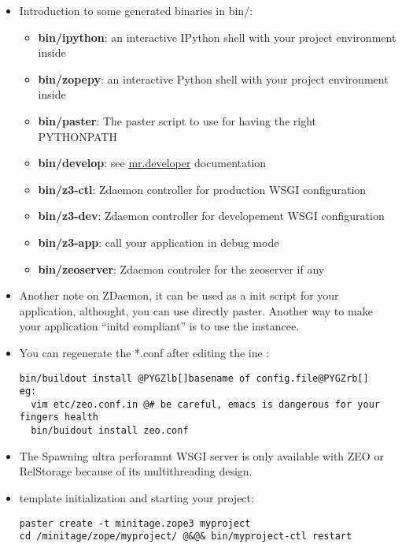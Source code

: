 \documentclass[letterpaper,10pt,english]{sphinxmanual}
\begin{document}
\begin{itemize}
\begin{itemize}
\end{itemize}

\item {} 
Introduction to some generated binaries in bin/:
\begin{itemize}
\item {} 
\textbf{bin/ipython}: an interactive IPython shell with your project environment inside

\item {} 
\textbf{bin/zopepy}: an interactive Python shell with your project environment inside

\item {} 
\textbf{bin/paster}: The paster script to use for having the right PYTHONPATH

\item {} 
\textbf{bin/develop}: see \href{http://pypi.python.org/pypi/mr.developer}{mr.developer} documentation

\item {} 
\textbf{bin/z3-ctl}: Zdaemon controller for production WSGI configuration

\item {} 
\textbf{bin/z3-dev}: Zdaemon controller for developement WSGI configuration

\item {} 
\textbf{bin/z3-app}: call your application in debug mode

\item {} 
\textbf{bin/zeoserver}: Zdaemon controler for the zeoserver if any

\end{itemize}

\item {} 
Another note on ZDaemon, it can be used as a init script for your application,
althought, you can use directly paster. Another way to make your application
``initd compliant'' is to use the  instancee.

\item {} 
You can regenerate the *.conf after editing the  ine :

\begin{Verbatim}[commandchars=@\[\]]
bin/buildout install @PYGZlb[]basename of config.file@PYGZrb[]
eg:
  vim etc/zeo.conf.in @# be careful, emacs is dangerous for your fingers health
  bin/buidout install zeo.conf
\end{Verbatim}

\item {} 
The Spawning ultra perforamnt WSGI server is only available with ZEO or RelStorage because of
its multithreading design.

\item {} 
template initialization and starting your project:

\begin{Verbatim}[commandchars=@\[\]]
paster create -t minitage.zope3 myproject
cd /minitage/zope/myproject/ @&@& bin/myproject-ctl restart
\end{Verbatim}

\end{itemize}
\end{document}
